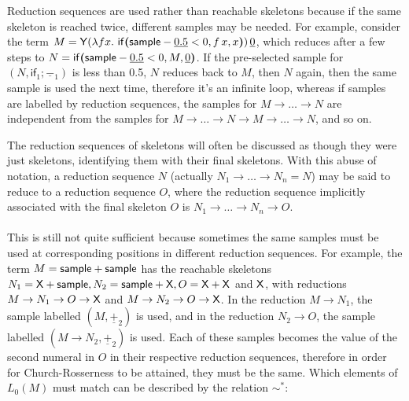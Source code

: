 Reduction sequences are used rather than reachable skeletons because if the same skeleton is reached twice, different samples may be needed. For example, consider the term $M = \mathsf{Y} (\lambda f x.\ \mathsf{if}\boldsymbol{(}\mathsf{sample} - \underline{0.5} < 0, f \, x, x\boldsymbol{)}) \, \underline 0$, which reduces after a few steps to $N = \mathsf{if}\boldsymbol{(}\mathsf{sample} - \underline{0.5}  < 0, M, \underline 0\boldsymbol{)}$. If the pre-selected sample for $(N,\textsf{if}_1;\underline{-}_1)$ is less than 0.5, $N$ reduces back to $M$, then $N$ again, then the same sample is used the next time, therefore it's an infinite loop, whereas if samples are labelled by reduction sequences, the samples for $M \to \dots \to N$ are independent from the samples for $M \to \dots \to N \to M \to \dots \to N$, and so on.

The reduction sequences of skeletons will often be discussed as though they were just skeletons, identifying them with their final skeletons. With this abuse of notation, a reduction sequence $N$ (actually $N_1 \to \dots \to N_n = N$) may be said to reduce to a reduction sequence $O$, where the reduction sequence implicitly associated with the final skeleton $O$ is $N_1 \to \dots \to N_n \to O$.

\paragraph{}
This is still not quite sufficient because sometimes the same samples must be used at corresponding positions in different reduction sequences. For example, the term $M = \mathsf{sample} + \mathsf{sample}$ has the reachable skeletons $N_1 = \mathsf{X} + \mathsf{sample}, N_2 = \mathsf{sample} + \mathsf{X}, O = \mathsf{X} + \mathsf{X}$ and $\mathsf{X}$, with reductions $M \to N_1 \to O \to \mathsf{X}$ and $M \to N_2 \to O \to \mathsf{X}$. In the reduction $M \to N_1$, the sample labelled $(M, \underline{+}_2)$ is used, and in the reduction $N_2 \to O$, the sample labelled $(M \to N_2, \underline{+}_2)$ is used. Each of these samples becomes the value of the second numeral in $O$ in their respective reduction sequences, therefore in order for Church-Rosserness to be attained, they must be the same. Which elements of $L_0(M)$ must match can be described by the relation $\sim^*$:

